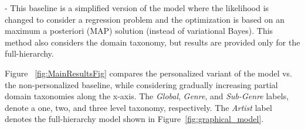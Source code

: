  - This baseline is a simplified version of the model where the likelihood is changed to consider a regression problem and the optimization is based on an maximum a posteriori (MAP) solution (instead of variational Bayes). This method also considers the domain taxonomy, but results are provided only for the full-hierarchy. 






Figure ~\ref{fig:MainResultsFig} compares the personalized variant of the model vs. the non-personalized baseline, while considering gradually increasing partial domain taxonomies along the x-axis. The \textit{Global}, \textit{Genre}, and \textit{Sub-Genre} labels, denote a one, two, and three level taxonomy, respectively. The \textit{Artist} label denotes the full-hierarchy model shown in Figure~\ref{fig:graphical_model}.

